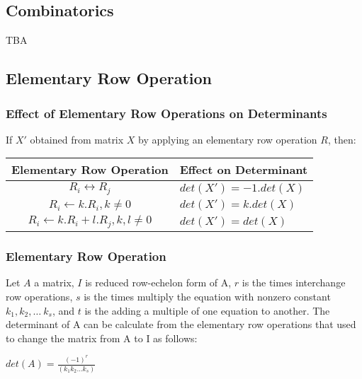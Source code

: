 \documentclass[a4paper,12pt]{article}
\begin{document}
\subsection*{Combinatorics}
TBA

\subsection*{Elementary Row Operation}
\subsubsection*{Effect of Elementary Row Operations on Determinants}
If \(X'\) obtained from matrix \(X\) by applying an elementary row operation \(R\), then: \begin{center}
  \begin{tabular}{|c|l|} \hline
    \textbf{Elementary Row Operation}         & \textbf{Effect on Determinant} \\ \hline
    \(R_i\leftrightarrow R_j\)                & \(det(X')=-1.det(X)\)          \\ \hline
    \(R_i\leftarrow k.R_i, k\neq 0 \)         & \(det(X')=k.det(X)\)           \\ \hline
    \(R_i\leftarrow k.R_i+l.R_j, k,l\neq 0 \) & \(det(X')=det(X)\)             \\ \hline
  \end{tabular}
\end{center}
\subsubsection*{Elementary Row Operation}
Let \(A\) a matrix, \(I\) is reduced row-echelon form of A, \(r\) is the times interchange row operations, \(s\) is the times multiply the equation with nonzero constant \(k_1,k_2,\dots\ k_s\), and \(t\) is the adding a multiple of one equation to another. The determinant of A can be calculate from the elementary row operations that used to change the matrix from A to I as follows:
\begin{center}
  \(det(A)=\frac{(-1)^r}{(k_1k_2\dots k_s)}\)
\end{center}
\end{document}
